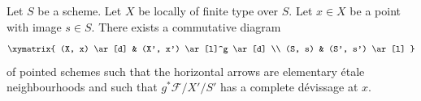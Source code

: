 %
\begin{proposition}
\label{proposition-existence-complete-at-x}
Let $S$ be a scheme.
Let $X$ be locally of finite type over $S$.
Let $x \in X$ be a point with image $s \in S$.
There exists a commutative diagram
$$
\xymatrix{
(X, x) \ar[d] & (X', x') \ar[l]^g \ar[d] \\
(S, s) & (S', s') \ar[l]
}
$$
of pointed schemes such that the horizontal
arrows are elementary \'etale neighbourhoods
and such that $g^*\mathcal{F}/X'/S'$ has a complete
d\'evissage at $x$.
\end{proposition}

